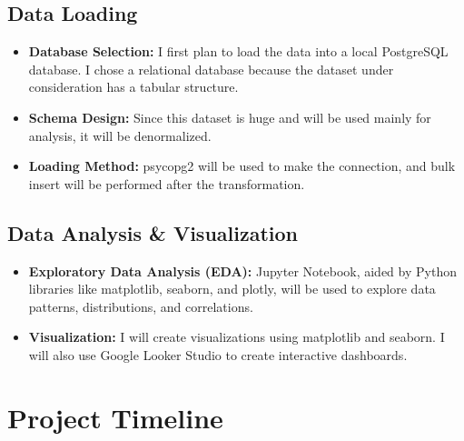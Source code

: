 \documentclass{article}
\begin{document}
\subsection{Data Loading}
\begin{itemize}[leftmargin=2em]
    \item \textbf{Database Selection:} I first plan to load the data into a local PostgreSQL database. I chose a relational database because the dataset under consideration has a tabular structure.
    \item \textbf{Schema Design:} Since this dataset is huge and will be used mainly for analysis, it will be denormalized.
    \item \textbf{Loading Method:} psycopg2 will be used to make the connection, and bulk insert will be performed after the transformation.
\end{itemize}

\subsection{Data Analysis \& Visualization}
\begin{itemize}
    \item \textbf{Exploratory Data Analysis (EDA):} Jupyter Notebook, aided by Python libraries like matplotlib, seaborn, and plotly, will be used to explore data patterns, distributions, and correlations.
    \item \textbf{Visualization:} I will create visualizations using matplotlib and seaborn. I will also use Google Looker Studio to create interactive dashboards.
\end{itemize}

\section{Project Timeline}
\end{document}
